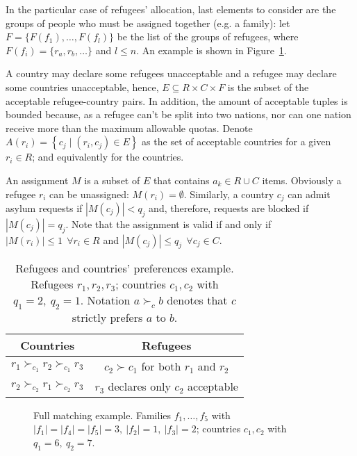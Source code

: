 In the particular case of refugees' allocation, last elements to consider are the groups of people who must be assigned together (e.g. a family): let \(F=\{F(f_1), \dots, F(f_l)\}\) be the list of the groups of refugees, where \(F(f_i) = \{r_a, r_b, \dots\}\) and \(l \leq n\).
An example is shown in Figure~\ref{fig:complete_matching}.

A country may declare some refugees unacceptable and a refugee may declare some countries unacceptable, hence, \(E \subseteq R \times C \times F\) is the subset of the acceptable refugee-country pairs. In addition, the amount of acceptable tuples is bounded because, as a refugee can't be split into two nations, nor can one nation receive more than the maximum allowable quotas. Denote \(A \left( r_i \right) = \left\{ c_j \mid \left( r_i, c_j \right) \in E \right\}\) as the set of acceptable countries for a given \(r_i \in R\); and equivalently for the countries.

An assignment \(M\) is a subset of \(E\) that contains \(a_k \in R \cup C\) items. Obviously a refugee \(r_i\) can be unassigned: \(M \left( r_i \right) = \emptyset\). Similarly, a country \(c_j\) can admit asylum requests if \(\left| M \left( c_j \right) \right| < q_j\) and, therefore, requests are blocked if \(\left| M \left( c_j \right) \right| = q_j\). Note that the assignment is valid if and only if \(\left| M \left( r_i \right) \right| \leq 1\ \ \forall r_i \in R\) and \(\left| M \left( c_j \right) \right| \leq q_j\ \ \forall c_j \in C\).

\begin{table}[!htb]
    \centering
    \begin{tabular}{c|c}
        \hline Countries & Refugees \\
        \hline \(r_1 \succ_{c_1} r_2 \succ_{c_1} r_3\) & \(c_2 \succ c_1\) for both \(r_1\) and \(r_2\) \\
        \(r_2 \succ_{c_2} r_1 \succ_{c_2} r_3\) & \(r_3\) declares only \(c_2\) acceptable \\
        \hline
    \end{tabular}
    \caption{Refugees and countries' preferences example. Refugees \(r_1, r_2, r_3\); countries \(c_1, c_2\) with \(q_1 = 2,\ q_2 = 1\). Notation \(a \succ_c b\) denotes that \(c\) strictly prefers \(a\) to \(b\).}
    \label{tab:countries-refugees}
    \vspace{-2em}
\end{table}

\begin{figure}[!htb]
    \centering{%
        \resizebox{0.9\columnwidth}{!}{%
            \def\svgwidth{\columnwidth}%
        }
    }
    \vspace{-0.5em}
    \caption{Full matching example. Families \(f_1, \dots, f_5\) with \(|f_1|=|f_4|=|f_5|=3,\ |f_2|=1,\ |f_3|=2\); countries \(c_1, c_2\) with \(q_1 = 6,\ q_2 = 7\).}
    \label{fig:complete_matching}
    \vspace{-1.5em}
\end{figure}
